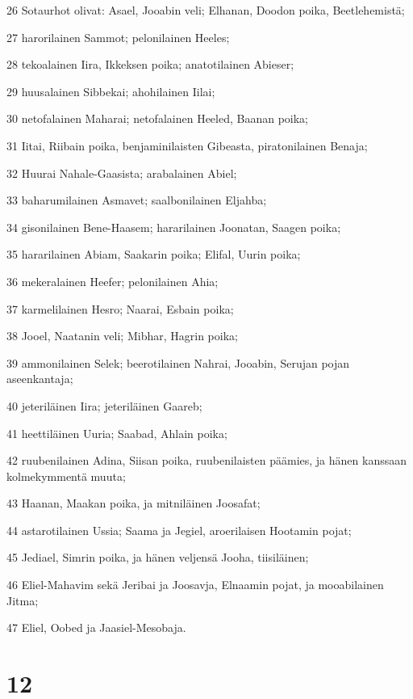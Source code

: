 \par 26 Sotaurhot olivat: Asael, Jooabin veli; Elhanan, Doodon poika, Beetlehemistä;
\par 27 harorilainen Sammot; pelonilainen Heeles;
\par 28 tekoalainen Iira, Ikkeksen poika; anatotilainen Abieser;
\par 29 huusalainen Sibbekai; ahohilainen Iilai;
\par 30 netofalainen Maharai; netofalainen Heeled, Baanan poika;
\par 31 Iitai, Riibain poika, benjaminilaisten Gibeasta, piratonilainen Benaja;
\par 32 Huurai Nahale-Gaasista; arabalainen Abiel;
\par 33 baharumilainen Asmavet; saalbonilainen Eljahba;
\par 34 gisonilainen Bene-Haasem; hararilainen Joonatan, Saagen poika;
\par 35 hararilainen Abiam, Saakarin poika; Elifal, Uurin poika;
\par 36 mekeralainen Heefer; pelonilainen Ahia;
\par 37 karmelilainen Hesro; Naarai, Esbain poika;
\par 38 Jooel, Naatanin veli; Mibhar, Hagrin poika;
\par 39 ammonilainen Selek; beerotilainen Nahrai, Jooabin, Serujan pojan aseenkantaja;
\par 40 jeteriläinen Iira; jeteriläinen Gaareb;
\par 41 heettiläinen Uuria; Saabad, Ahlain poika;
\par 42 ruubenilainen Adina, Siisan poika, ruubenilaisten päämies, ja hänen kanssaan kolmekymmentä muuta;
\par 43 Haanan, Maakan poika, ja mitniläinen Joosafat;
\par 44 astarotilainen Ussia; Saama ja Jegiel, aroerilaisen Hootamin pojat;
\par 45 Jediael, Simrin poika, ja hänen veljensä Jooha, tiisiläinen;
\par 46 Eliel-Mahavim sekä Jeribai ja Joosavja, Elnaamin pojat, ja mooabilainen Jitma;
\par 47 Eliel, Oobed ja Jaasiel-Mesobaja.

\chapter{12}

